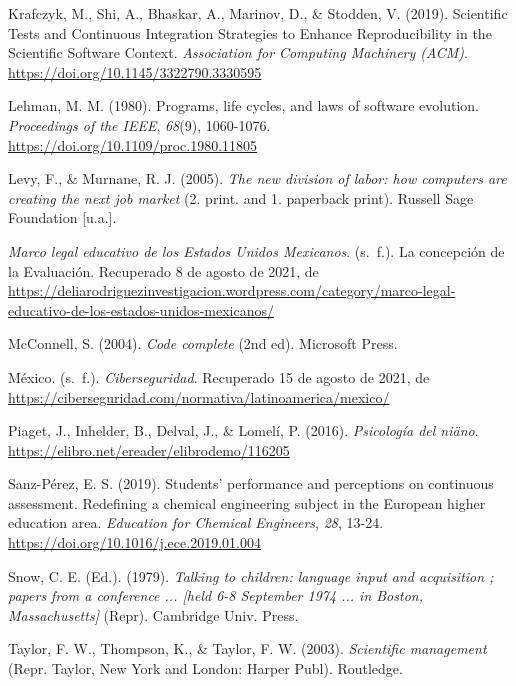 \documentclass[
  12,
]{scrartcl}
\newlength{\cslhangindent}
\newlength{\cslentryspacingunit} %
\newenvironment{CSLReferences}[2] %
 {%
  \setlength{\parindent}{0pt}
  \ifodd #1
  \let\oldpar\par
  \def\par{\hangindent=\cslhangindent\oldpar}
  \fi
  \setlength{\parskip}{#2\cslentryspacingunit}
 }%
 {}
\begin{document}
\begin{CSLReferences}{1}{0}
\leavevmode\hypertarget{ref-zaYZE70v}{}%
Krafczyk, M., Shi, A., Bhaskar, A., Marinov, D., \& Stodden, V. (2019).
Scientific Tests and Continuous Integration Strategies to Enhance
Reproducibility in the Scientific Software Context. \emph{Association
for Computing Machinery (ACM)}.
\url{https://doi.org/10.1145/3322790.3330595}

\leavevmode\hypertarget{ref-61Mhr63C}{}%
Lehman, M. M. (1980). Programs, life cycles, and laws of software
evolution. \emph{Proceedings of the IEEE}, \emph{68}(9), 1060-1076.
\url{https://doi.org/10.1109/proc.1980.11805}

\leavevmode\hypertarget{ref-UmmD4xUI}{}%
Levy, F., \& Murnane, R. J. (2005). \emph{The new division of labor: how
computers are creating the next job market} (2. print. and 1. paperback
print). Russell Sage Foundation {[}u.a.{]}.

\leavevmode\hypertarget{ref-JJPwy3DY}{}%
\emph{Marco legal educativo de los Estados Unidos Mexicanos}. (s.~f.).
La concepción de la Evaluación. Recuperado 8 de agosto de 2021, de
\url{https://deliarodriguezinvestigacion.wordpress.com/category/marco-legal-educativo-de-los-estados-unidos-mexicanos/}

\leavevmode\hypertarget{ref-HDmPArpB}{}%
McConnell, S. (2004). \emph{Code complete} (2nd ed). Microsoft Press.

\leavevmode\hypertarget{ref-LX5rGLI1}{}%
México. (s.~f.). \emph{Ciberseguridad}. Recuperado 15 de agosto de 2021,
de \url{https://ciberseguridad.com/normativa/latinoamerica/mexico/}

\leavevmode\hypertarget{ref-tZcz0BiL}{}%
Piaget, J., Inhelder, B., Delval, J., \& Lomelí, P. (2016).
\emph{Psicología del niäno}.
\url{https://elibro.net/ereader/elibrodemo/116205}

\leavevmode\hypertarget{ref-BplcWPD4}{}%
Sanz-Pérez, E. S. (2019). Students' performance and perceptions on
continuous assessment. Redefining a chemical engineering subject in the
European higher education area. \emph{Education for Chemical Engineers},
\emph{28}, 13-24. \url{https://doi.org/10.1016/j.ece.2019.01.004}

\leavevmode\hypertarget{ref-9cCPbJWa}{}%
Snow, C. E. (Ed.). (1979). \emph{Talking to children: language input and
acquisition ; papers from a conference ... {[}held 6-8 September 1974
... in Boston, Massachusetts{]}} (Repr). Cambridge Univ. Press.

\leavevmode\hypertarget{ref-L4JMQzSC}{}%
Taylor, F. W., Thompson, K., \& Taylor, F. W. (2003). \emph{Scientific
management} (Repr. Taylor, New York and London: Harper Publ). Routledge.


\end{CSLReferences}
\end{document}
